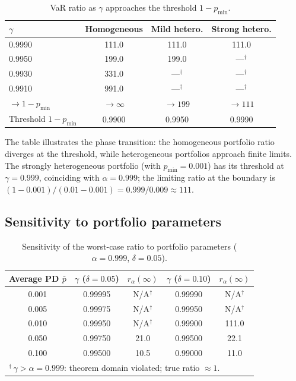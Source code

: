 \documentclass[11pt]{article}
\theoremstyle{definition}
\newcommand{\1}{\mathbf{1}}
\begin{document}
\begin{table}[h]
\centering
\caption{VaR ratio as $\gamma$ approaches the threshold $1 - p_{\min}$.}
\label{tab:phase}
\begin{tabular}{lccc}
\toprule
$\gamma$ & Homogeneous & Mild hetero. & Strong hetero. \\
\midrule
0.9990 & 111.0 & 111.0 & 111.0 \\
0.9950 & 199.0 & 199.0 & ---$^{\dagger}$ \\
0.9930 & 331.0 & ---$^{\dagger}$ & ---$^{\dagger}$ \\
0.9910 & 991.0 & ---$^{\dagger}$ & ---$^{\dagger}$ \\
$\to 1 - p_{\min}$ & $\to \infty$ & $\to 199$ & $\to 111$ \\
Threshold $1 - p_{\min}$ & 0.9900 & 0.9950 & 0.9990 \\
\bottomrule
\end{tabular}
\end{table}

The table illustrates the phase transition: the homogeneous portfolio ratio diverges at the threshold, while heterogeneous portfolios approach finite limits. The strongly heterogeneous portfolio (with $p_{\min} = 0.001$) has its threshold at $\gamma = 0.999$, coinciding with $\alpha = 0.999$; the limiting ratio at the boundary is $(1-0.001)/(0.01-0.001) = 0.999/0.009 \approx 111$.

\subsection{Sensitivity to portfolio parameters}

\begin{table}[h]
\centering
\caption{Sensitivity of the worst-case ratio to portfolio parameters ($\alpha = 0.999$, $\delta = 0.05$).}
\label{tab:sensitivity}
\begin{tabular}{ccccc}
\toprule
Average PD $\bar{p}$ & $\gamma$ ($\delta\!=\!0.05$) & $r_\alpha(\infty)$ & $\gamma$ ($\delta\!=\!0.10$) & $r_\alpha(\infty)$ \\
\midrule
0.001 & 0.99995 & N/A$^{\dagger}$ & 0.99990 & N/A$^{\dagger}$ \\
0.005 & 0.99975 & N/A$^{\dagger}$ & 0.99950 & N/A$^{\dagger}$ \\
0.010 & 0.99950 & N/A$^{\dagger}$ & 0.99900 & 111.0 \\
0.050 & 0.99750 & 21.0 & 0.99500 & 22.1 \\
0.100 & 0.99500 & 10.5 & 0.99000 & 11.0 \\
\bottomrule
\multicolumn{5}{l}{\footnotesize ${}^{\dagger}$\,$\gamma > \alpha = 0.999$: theorem domain violated; true ratio $\approx 1$.}
\end{tabular}
\end{table}
\end{document}

